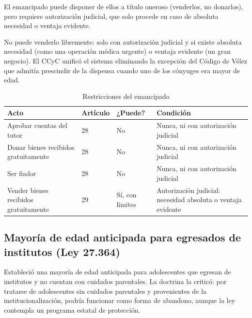 \documentclass[12pt,oneside]{book}
\begin{document}
\begin{regla}
El emancipado puede disponer de ellos a título oneroso (venderlos, no donarlos), pero requiere autorización judicial, que solo procede en caso de absoluta necesidad o ventaja evidente.
\end{regla}

\begin{ejemplo}
No puede venderlo libremente: solo con autorización judicial y si existe absoluta necesidad (como una operación médica urgente) o ventaja evidente (un gran negocio). El CCyC unificó el sistema eliminando la excepción del Código de Vélez que admitía prescindir de la dispensa cuando uno de los cónyuges era mayor de edad.
\end{ejemplo}

\begin{table}[H]
\centering
\begin{tabularx}{\textwidth}{Y B{0.14\textwidth} B{0.16\textwidth} Y}
\toprule
\textbf{Acto} & \textbf{Artículo} & \textbf{¿Puede?} & \textbf{Condición} \\
\midrule
Aprobar cuentas del tutor & 28 & No & Nunca, ni con autorización judicial \\
Donar bienes recibidos gratuitamente & 28 & No & Nunca, ni con autorización judicial \\
Ser fiador & 28 & No & Nunca, ni con autorización judicial \\
Vender bienes recibidos gratuitamente & 29 & Sí, con límites & Autorización judicial: necesidad absoluta o ventaja evidente \\
\bottomrule
\end{tabularx}
\caption{Restricciones del emancipado}
\end{table}

\subsection{Mayoría de edad anticipada para egresados de institutos (Ley 27.364)}

Estableció una mayoría de edad anticipada para adolescentes que egresan de institutos y no cuentan con cuidados parentales. La doctrina la criticó: por tratarse de adolescentes sin cuidados parentales y provenientes de la institucionalización, podría funcionar como forma de abandono, aunque la ley contempla un programa estatal de protección.
\end{document}
